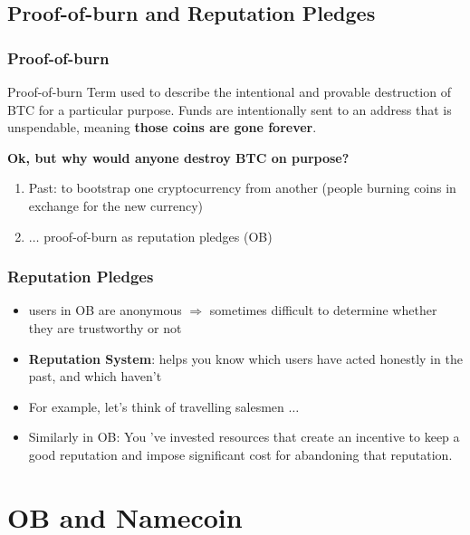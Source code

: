 \documentclass{beamer}
\begin{document}
\subsection{Proof-of-burn and Reputation Pledges}
\begin{frame}
\frametitle{Proof-of-burn}
\begin{block}{Proof-of-burn}
Term used to describe the intentional and provable destruction of BTC for a particular purpose. Funds are intentionally sent to an address that is unspendable, meaning {\bf those coins are gone forever}.
\end{block} \pause

{\bf Ok, but why would anyone destroy BTC on purpose?} \pause
\begin{enumerate}
\item Past: to bootstrap one cryptocurrency from another (people burning coins in exchange for the new currency)

\item $\dots$ proof-of-burn as reputation pledges (OB)
\end{enumerate}
\end{frame}
\begin{frame}
\frametitle{Reputation Pledges}
\begin{itemize}
\item users in OB are anonymous \pause $\Rightarrow$ sometimes difficult to determine whether they are trustworthy or not
\item {\bf Reputation System}: \pause helps you know which users have acted honestly in the past, and which haven't

\item For example, let's think of travelling salesmen $\dots$

\item Similarly in OB: You 've invested resources that create an incentive to keep a good reputation and impose significant cost for abandoning that reputation.
\end{itemize}
\end{frame}
\section{OB and Namecoin}
\end{document}
